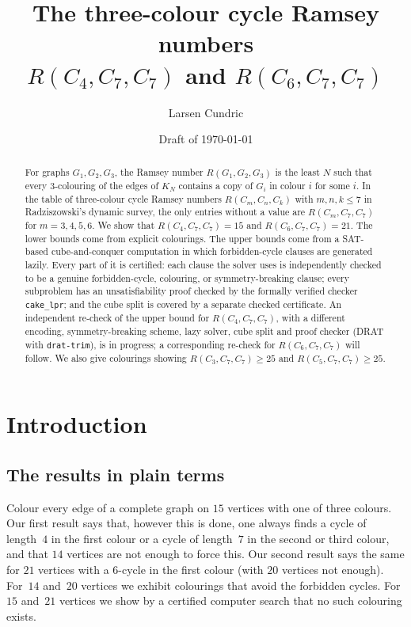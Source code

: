 \documentclass[11pt]{amsart}
\title[The cycle Ramsey numbers $R(C_4,C_7,C_7)$ and $R(C_6,C_7,C_7)$]{The three-colour cycle Ramsey numbers\\ $R(C_4,C_7,C_7)$ and $R(C_6,C_7,C_7)$}
\author{Larsen Cundric}
\date{Draft of \today}
\theoremstyle{definition}
\theoremstyle{remark}
\begin{document}
\begin{abstract}
For graphs $G_1,G_2,G_3$, the Ramsey number $R(G_1,G_2,G_3)$ is the least $N$ such that every $3$-colouring of the edges of
$K_N$ contains a copy of $G_i$ in colour $i$ for some $i$. In the table of three-colour cycle Ramsey numbers
$R(C_m,C_n,C_k)$ with $m,n,k\le 7$ in Radziszowski's dynamic survey, the only entries without a value are
$R(C_m,C_7,C_7)$ for $m=3,4,5,6$. We show that $R(C_4,C_7,C_7)=15$ and $R(C_6,C_7,C_7)=21$.
The lower bounds come from explicit colourings. The upper bounds come from a SAT-based cube-and-conquer
computation in which forbidden-cycle clauses are generated lazily. Every part of it is certified: each clause the solver uses
is independently checked to be a genuine forbidden-cycle, colouring, or symmetry-breaking clause; every subproblem has an
unsatisfiability proof checked by the formally verified checker \texttt{cake\_lpr}; and the cube split is covered by a separate
checked certificate. An independent re-check of the upper bound for $R(C_4,C_7,C_7)$, with a different encoding,
symmetry-breaking scheme, lazy solver, cube split and proof checker (DRAT with \texttt{drat-trim}), is in progress; a
corresponding re-check for $R(C_6,C_7,C_7)$ will follow. We also give colourings showing $R(C_3,C_7,C_7)\ge 25$ and
$R(C_5,C_7,C_7)\ge 25$.
\end{abstract}

\maketitle

\section{Introduction}

\subsection*{The results in plain terms}
Colour every edge of a complete graph on $15$ vertices with one of three colours. Our first result says that, however this is
done, one always finds a cycle of length~$4$ in the first colour or a cycle of length~$7$ in the second or third colour, and that
$14$ vertices are not enough to force this. Our second result says the same for $21$ vertices with a $6$-cycle in the first colour
(with $20$ vertices not enough). For~$14$ and~$20$ vertices we exhibit colourings that avoid the forbidden cycles. For $15$
and~$21$ vertices we show by a certified computer search that no such colouring exists.
\end{document}
